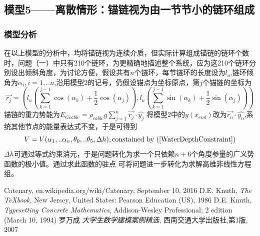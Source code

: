 \documentclass[a4paper,12pt]{ctexart}
\begin{document}
\subsection{模型5——离散情形：锚链视为由一节节小的链环组成}
\subsubsection{模型分析}
在以上模型的分析中，均将锚链视为连续介质，但实际计算组成锚链的链环个数时，问题（一）中只有210个链环，为更精确地描述整个系统，应为这210个链环分别设出倾斜角度，为讨论方便，假设共有$n$个链环，每节链环的长度设为$l_u$,链环倾角为$\alpha_i,i=1,..n$,沿用模型2的记号，仍假设锚点为坐标原点，第$j$个锚链的坐标为
\begin{equation}
\overrightarrow{r_j}=(l_u(\sum_{k=1}^{j-1} \cos(\alpha_k)+\frac{1}{2}\cos(\alpha_j)),
l_u(\sum_{k=1}^{j-1} \sin(\alpha_k) +\frac{1}{2}\sin(\alpha_j)))
\end{equation}
锚链的重力势能为$E_{Gcable}=\rho_{cable}g \sum_{j=1}^n \overrightarrow{r_j} \cdot \hat{y_j}$
将模型2中的$y(x_{end})$改为$\overrightarrow{r_n} \cdot \hat{y_n}$,系统其他节点的能量表达式不变，于是可得到
$$V=V(\alpha_1,..\alpha_n,\theta_0,..\theta_5,\Delta h),\text{constained by (\ref{WaterDepthConstraint}})$$
$\Delta h$可通过等式约束消元，于是问题转化为求一个只依赖$n+6$个角度参量的广义势函数的极小值。通过求此函数的驻点
可将问题进一步转化为求解高维非线性方程组。




\begin{thebibliography}{8}

 Catenary, en.wikipedia.org/wiki/Catenary, September 10, 2016
 D.E. Knuth, \emph{The {\TeX}book},  New Jersey, United States: Pearson Education (US), 1986
 D.E. Knuth, \emph{Typesetting Concrete Mathematics}, Addison-Wesley Professional; 2 edition (March 10, 1994)
 罗万成 \textsl{大学生数学建模案例精选}, 西南交通大学出版社,第1版, 2007

\end{thebibliography}




\newpage
\end{document}
